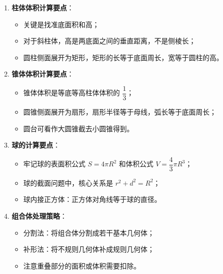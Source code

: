 \documentclass[11pt]{ctexrep}
\begin{document}
\begin{enumerate}
    \item \textbf{柱体体积计算要点}：
    \begin{itemize}
        \item 关键是找准底面积和高；
        \item 对于斜柱体，高是两底面之间的垂直距离，不是侧棱长；
        \item 圆柱侧面展开为矩形，矩形的长等于底面周长，宽等于圆柱的高。
    \end{itemize}
    
    \item \textbf{锥体体积计算要点}：
    \begin{itemize}
        \item 锥体体积是等底等高柱体体积的 $\dfrac{1}{3}$；
        \item 圆锥侧面展开为扇形，扇形半径等于母线，弧长等于底面周长；
        \item 圆台可看作大圆锥截去小圆锥得到。
    \end{itemize}
    
    \item \textbf{球的计算要点}：
    \begin{itemize}
        \item 牢记球的表面积公式 $S = 4\pi R^2$ 和体积公式 $V = \dfrac{4}{3}\pi R^3$；
        \item 球的截面问题中，核心关系是 $r^2 + d^2 = R^2$；
        \item 球内接正方体：正方体对角线等于球的直径。
    \end{itemize}
    
    \item \textbf{组合体处理策略}：
    \begin{itemize}
        \item 分割法：将组合体分割成若干基本几何体；
        \item 补形法：将不规则几何体补成规则几何体；
        \item 注意重叠部分的面积或体积需要扣除。
    \end{itemize}
\end{enumerate}
\end{document}
